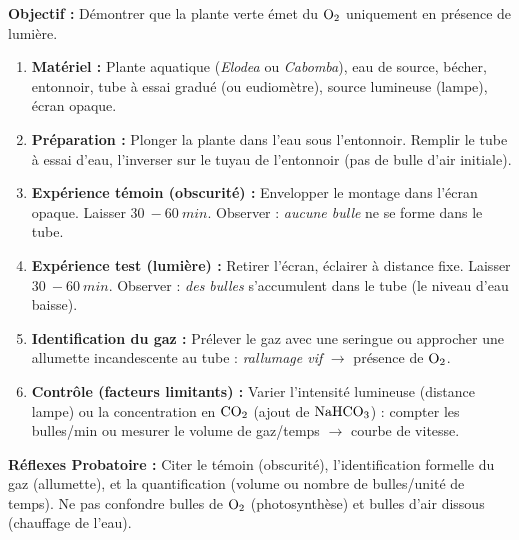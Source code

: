 \documentclass[11pt]{article}
\begin{document}
\begin{methode}
    \textbf{Objectif :} Démontrer que la plante verte émet du $\ce{O2}$ uniquement en présence de lumière.
    \begin{enumerate}
        \item \textbf{Matériel :} Plante aquatique (\emph{Elodea} ou \emph{Cabomba}), eau de source, bécher, entonnoir, tube à essai gradué (ou eudiomètre), source lumineuse (lampe), écran opaque.
        \item \textbf{Préparation :} Plonger la plante dans l'eau sous l'entonnoir. Remplir le tube à essai d'eau, l'inverser sur le tuyau de l'entonnoir (pas de bulle d'air initiale).
        \item \textbf{Expérience témoin (obscurité) :} Envelopper le montage dans l'écran opaque. Laisser $\SI{30}{-}\SI{60}{min}$. Observer : \emph{aucune bulle} ne se forme dans le tube.
        \item \textbf{Expérience test (lumière) :} Retirer l'écran, éclairer à distance fixe. Laisser $\SI{30}{-}\SI{60}{min}$. Observer : \emph{des bulles} s'accumulent dans le tube (le niveau d'eau baisse).
        \item \textbf{Identification du gaz :} Prélever le gaz avec une seringue ou approcher une allumette incandescente au tube : \emph{rallumage vif} $\rightarrow$ présence de $\ce{O2}$.
        \item \textbf{Contrôle (facteurs limitants) :} Varier l'intensité lumineuse (distance lampe) ou la concentration en $\ce{CO2}$ (ajout de $\ce{NaHCO3}$) : compter les bulles/min ou mesurer le volume de gaz/temps $\rightarrow$ courbe de vitesse.
    \end{enumerate}
    \textbf{Réflexes Probatoire :} Citer le témoin (obscurité), l'identification formelle du gaz (allumette), et la quantification (volume ou nombre de bulles/unité de temps). Ne pas confondre bulles de $\ce{O2}$ (photosynthèse) et bulles d'air dissous (chauffage de l'eau).
\end{methode}
\end{document}
